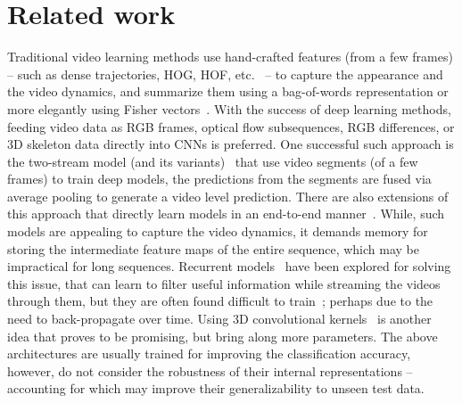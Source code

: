 \documentclass[runningheads]{llncs}
\begin{document}
 \section{Related work}
\label{related_work}
Traditional video learning methods use hand-crafted features (from a few frames) -- such as dense trajectories, HOG, HOF, etc.~\cite{wang2013action} -- to capture the appearance and the video dynamics, and summarize them using a bag-of-words representation or more elegantly using Fisher vectors~\cite{sadanand2012action}. With the success of deep learning methods, feeding video data as RGB frames, optical flow subsequences, RGB differences, or 3D skeleton data directly into CNNs is preferred. One successful such approach is the two-stream model (and its variants)~\cite{simonyan2014two,feichtenhofer2017temporal,feichtenhofer2017spatiotemporal,hayat2015deep} that use video segments (of a few frames) to train deep models, the predictions from the segments are fused via average pooling to generate a video level prediction. There are also extensions of this approach that directly learn models in an end-to-end manner~\cite{feichtenhofer2017spatiotemporal}. While, such models are appealing to capture the video dynamics, it demands memory for storing the intermediate feature maps of the entire sequence, which may be impractical for long sequences. Recurrent models~\cite{baccouche2011sequential,donahue2015long,du2015hierarchical,li2016action,srivastava2015unsupervised,yue2015beyond} have been explored for solving this issue, that can learn to filter useful information while streaming the videos through them, but they are often found difficult to train~\cite{pascanu2013difficulty}; perhaps due to the need to back-propagate over time. Using 3D convolutional kernels~\cite{carreira2017quo,tran2015learning} is another idea that proves to be promising, but bring along more parameters. The above architectures are usually trained for improving the classification accuracy, however, do not consider the robustness of their internal representations -- accounting for which may improve their generalizability to unseen test data. 
\end{document}
